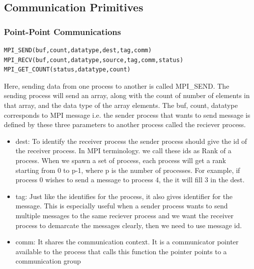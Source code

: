 \documentclass[12pt]{article}
\begin{document}
\subsection{Communication Primitives}
\subsubsection{Point-Point Communications}
\begin{lstlisting}
MPI_SEND(buf,count,datatype,dest,tag,comm)
MPI_RECV(buf,count,datatype,source,tag,comm,status)
MPI_GET_COUNT(status,datatype,count)
\end{lstlisting}
Here, sending data from one process to another is called MPI\_SEND.
The sending process will send an array, along with the count of number of elements in that array, and the data type of the array elements. 
The buf, count, datatype corresponds to MPI message i.e. the sender process that wants to send message is defined by these three parameters to another process called the reciever process. 
\begin{itemize}
    \item dest: To identify the receiver process the sender process should give the id of the receiver process. In MPI terminology. we call these ids as Rank of a process. When we spawn a set of process, each process will get a rank starting from 0 to p-1, where p is the number of processes. For example, if process 0 wishes to send a message to process 4, the it will fill 3 in the dest.
    \item tag: Just like the identifies for the process, it also gives identifier for the message. This is especially useful when a sender process wants to send multiple messages to the same reciever process and we want the receiver process to demarcate the messages clearly, then we need to use message id.
    \item comm: It shares the communication context. It is a communicator pointer available to the process that calls this function the pointer points to a communication group 
\end{itemize}
\end{document}
